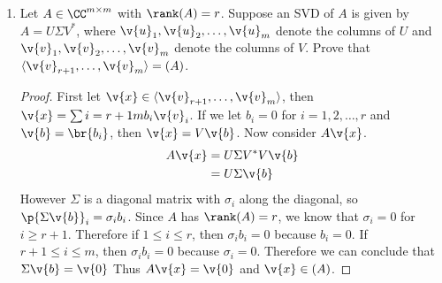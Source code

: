 \documentclass[11pt]{article}
\begin{document}
\begin{enumerate}
\begin{enumerate}
            \item[(b)]

        \end{enumerate}

    \item %
        Let $A \in \CC^{m \times m}$ with $\rank(A) = r$.
        Suppose an SVD of $A$ is given by $A = U\Sigma V^*$, where
        $\v{u}_1, \v{u}_2, \ldots, \v{u}_m$ denote the columns of $U$ and
        $\v{v}_1, \v{v}_2, \ldots, \v{v}_m$ denote the columns of $V$.
        Prove that $\langle\v{v}_{r+1}, \ldots, \v{v}_m\rangle = \null(A)$.

        \begin{proof}
            First let $\v{x} \in \langle\v{v}_{r+1}, \ldots, \v{v}_m\rangle$, then
            $\v{x} = \sum{i = r+1}{m}{b_i \v{v}_i}$.
            If we let $b_i = 0$ for $i = 1, 2, \ldots, r$ and $\v{b} = \br{b_i}$,
            then $\v{x} = V\v{b}$.
            Now consider $A\v{x}$.
            \begin{align*}
                A\v{x} &= U\Sigma V^* V \v{b} \\
                       &= U \Sigma \v{b}
            \end{align*}
            However $\Sigma$ is a diagonal matrix with $\sigma_i$ along the
            diagonal, so $\p{\Sigma \v{b}}_i = \sigma_i b_i$.
            Since $A$ has $\rank(A) = r$, we know that $\sigma_i = 0$ for
            $i \ge r + 1$.
            Therefore if $1 \le i \le r$, then $\sigma_i b_i = 0$ because
            $b_i = 0$.
            If $r + 1 \le i \le m$, then $\sigma_i b_i = 0$ because
            $\sigma_i = 0$.
            Therefore we can conclude that $\Sigma \v{b} = \v{0}$
            Thus $A\v{x} = \v{0}$ and $\v{x} \in \null(A)$.


\end{proof}
\end{enumerate}
\end{document}
